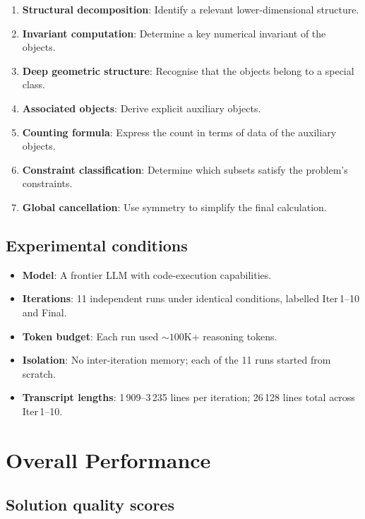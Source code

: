 \documentclass[11pt,a4paper]{article}
\begin{document}
\begin{enumerate}[label=\textbf{S\arabic*.},leftmargin=2.5em]
  \item \textbf{Structural decomposition}: Identify a relevant
    lower-dimensional structure.
  \item \textbf{Invariant computation}: Determine a key numerical
    invariant of the objects.
  \item \textbf{Deep geometric structure}: Recognise that the objects
    belong to a special class.
  \item \textbf{Associated objects}: Derive explicit auxiliary objects.
  \item \textbf{Counting formula}: Express the count in terms of data
    of the auxiliary objects.
  \item \textbf{Constraint classification}: Determine which subsets
    satisfy the problem's constraints.
  \item \textbf{Global cancellation}: Use symmetry to simplify the
    final calculation.
\end{enumerate}

\subsection{Experimental conditions}

\begin{itemize}[nosep]
  \item \textbf{Model}: A frontier LLM with code-execution
    capabilities.
  \item \textbf{Iterations}: 11 independent runs under identical
    conditions, labelled Iter\,1--10 and Final.
  \item \textbf{Token budget}: Each run used ${\sim}100$K+ reasoning
    tokens.
  \item \textbf{Isolation}: No inter-iteration memory; each of the 11
    runs started from scratch.
  \item \textbf{Transcript lengths}: 1\,909--3\,235 lines per
    iteration; 26\,128 lines total across Iter\,1--10.
\end{itemize}


\section{Overall Performance}\label{sec:performance}

\subsection{Solution quality scores}
\end{document}

